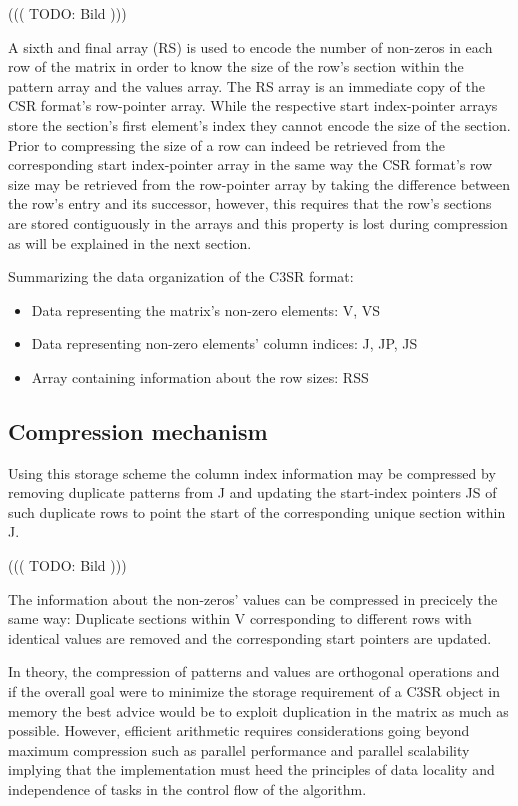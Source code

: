 \documentclass{article}
\begin{document}
      ((( TODO: Bild )))

    A sixth and final array (RS) is used to encode the number of non-zeros in each row of the matrix in order to know
    the size of the row's section within the pattern array and the values array. The RS array is an immediate copy of
    the CSR format's row-pointer array.  While the respective start index-pointer arrays store the section's first
    element's index they cannot encode the size of the section. Prior to compressing the size of a row can indeed be
    retrieved from the corresponding start index-pointer array in the same way the CSR format's row size may be
    retrieved from the row-pointer array by taking the difference between the row's entry and its successor, however,
    this requires that the row's sections are stored contiguously in the arrays and this property is lost during
    compression as will be explained in the next section.

    Summarizing the data organization of the C3SR format:
    \begin{itemize}
      \item Data representing the matrix's non-zero elements: V, VS
      \item Data representing non-zero elements' column indices: J, JP, JS
      \item Array containing information about the row sizes: RSS
    \end{itemize}

  \subsection{Compression mechanism}

    Using this storage scheme the column index information may be compressed by removing duplicate patterns from J and
    updating the start-index pointers JS of such duplicate rows to point the start of the corresponding unique section
    within J.

      ((( TODO: Bild )))

    The information about the non-zeros' values can be compressed in precicely the same way: Duplicate sections within V
    corresponding to different rows with identical values are removed and the corresponding start pointers are updated.

    In theory, the compression of patterns and values are orthogonal operations and if the overall goal were to minimize
    the storage requirement of a C3SR object in memory the best advice would be to exploit duplication in the matrix as
    much as possible. However, efficient arithmetic requires considerations going beyond maximum compression such as
    parallel performance and parallel scalability implying that the implementation must heed the principles of
    data locality and independence of tasks in the control flow of the algorithm.
\end{document}
